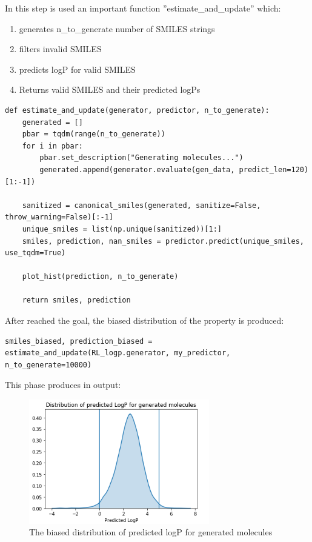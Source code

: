 \documentclass[a4paper]{article}
\begin{document}
In this step is used an important function ''estimate\_and\_update'' which:
\begin{enumerate}
	\item generates n\_to\_generate number of SMILES strings
	\item filters invalid SMILES
	\item predicts logP for valid SMILES
	\item Returns valid SMILES and their predicted logPs
\end{enumerate}

\begin{lstlisting}
def estimate_and_update(generator, predictor, n_to_generate):
    generated = []
    pbar = tqdm(range(n_to_generate))
    for i in pbar:
        pbar.set_description("Generating molecules...")
        generated.append(generator.evaluate(gen_data, predict_len=120)[1:-1])

    sanitized = canonical_smiles(generated, sanitize=False, throw_warning=False)[:-1]
    unique_smiles = list(np.unique(sanitized))[1:]
    smiles, prediction, nan_smiles = predictor.predict(unique_smiles, use_tqdm=True)  
                                                       
    plot_hist(prediction, n_to_generate)
        
    return smiles, prediction
\end{lstlisting}

After reached the goal, the biased distribution of the property is produced:

\begin{lstlisting}
smiles_biased, prediction_biased = estimate_and_update(RL_logp.generator, my_predictor, n_to_generate=10000)
\end{lstlisting}

This phase produces in output: 

\begin{figure}[htbp]
		\centering
			\includegraphics[width=0.70\textwidth]{biased.png}
        \caption{The biased distribution of predicted logP for generated molecules}
		\label{fig:biased}
	\end{figure}
\end{document}
